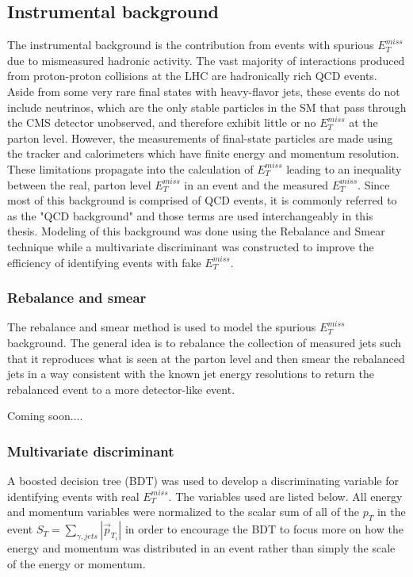 \subsection{Instrumental background}
The instrumental background is the contribution from events with spurious $E^{miss}_T$ due to mismeasured hadronic activity.  The vast majority of interactions produced from proton-proton collisions at the LHC are hadronically rich QCD events.  Aside from some very rare final states with heavy-flavor jets, these events do not include neutrinos, which are the only stable particles in the SM that pass through the CMS detector unobserved, and therefore exhibit little or no $E^{miss}_T$ at the parton level.  However, the measurements of final-state particles are made using the tracker and calorimeters which have finite energy and momentum resolution.  These limitations propagate into the calculation of $E^{miss}_T$ leading to an inequality between the real, parton level $E^{miss}_T$ in an event and the measured $E^{miss}_T$.  Since most of this background is comprised of QCD events, it is commonly referred to as the "QCD background" and those terms are used interchangeably in this thesis.  Modeling of this background was done using the Rebalance and Smear technique while a multivariate discriminant was constructed to improve the efficiency of identifying events with fake $E^{miss}_T$.

\subsubsection{Rebalance and smear}
The rebalance and smear method is used to model the spurious $E^{miss}_T$ background.  The general idea is to rebalance the collection of measured jets such that it reproduces what is seen at the parton level and then smear the rebalanced jets in a way consistent with the known jet energy resolutions to return the rebalanced event to a more detector-like event.

Coming soon....
\subsubsection{Multivariate discriminant}
A boosted decision tree (BDT) was used to develop a discriminating variable for identifying events with real $E^{miss}_T$.  The variables used are listed below.  All energy and momentum variables were normalized to the scalar sum of all of the $p_T$ in the event $S_T = \sum_{\gamma,jets} |\vec{p}_{T_i}|$ in order to encourage the BDT to focus more on how the energy and momentum was distributed in an event rather than simply the scale of the energy or momentum.  

